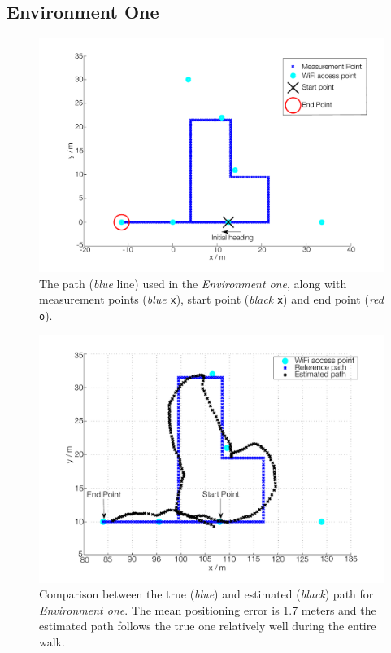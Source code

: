 \documentclass{LTHthesis}
\begin{document}
\subsection{Environment One} 
\begin{figure}[!hbt]

\includegraphics[width=1\textwidth ]{images/pure_rssi/env_one}
\caption{The path (\emph{blue} line) used in the \emph{Environment one}, along with measurement points (\emph{blue} \texttt{x}), start point (\emph{black} \texttt{x}) and end point (\emph{red} \texttt{o}).}\label{env_one}
\end{figure}
%
\begin{figure}[!hbt]

\includegraphics[width=1\textwidth ]{images/pure_rssi/true_vs_est_env_1_05}
\caption{Comparison between the true (\emph{blue}) and estimated (\emph{black}) path for \emph{Environment one}. The mean positioning error is 1.7 meters and the estimated path follows the true one relatively well during the entire walk.}\label{true_vs_est_env_1_05}
\end{figure}
\end{document}
